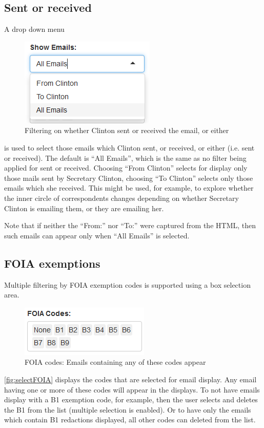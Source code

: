 \documentclass[journal]{vgtc}                %
\begin{document}
\subsection{Sent or received}
A drop down menu 
\begin{figure}[h]
\begin{center}
\includegraphics[width=0.35\linewidth]{ToFromImage}
\caption{Filtering on whether Clinton sent or received the email, or either}
\label{fig:toFromFilter}
\end{center}
\end{figure}
is used to select those emails which Clinton sent, or received, or either (i.e. sent or received).  The default is ``All Emails'', which is the same as no filter being applied for sent or received.  Choosing ``From Clinton'' selects for display only those mails sent by Secretary Clinton, choosing ``To  Clinton'' selects only those emails which she received.  This might be used, for example, to explore whether the inner circle of correspondents changes depending on whether Secretary Clinton is emailing them, or they are emailing her.

Note that if neither the ``From:''  nor ``To:''  were captured from the HTML, then such emails can appear only when ``All Emails'' is selected.


\subsection{FOIA exemptions}
Multiple filtering by FOIA exemption codes is supported using a box selection area. 
\begin{figure}[h]
\begin{center}
\includegraphics[width=0.55\linewidth]{FOIABoxImage}
\caption{FOIA codes:  Emails containing any of these codes appear}
\label{fig:selectFOIA}
\end{center}
\end{figure}
\autoref{fig:selectFOIA} displays the codes that are selected for email display.  Any email having one or more of these codes will appear in the displays.  To not have emails display with a B1 exemption code, for example, then the user selects and deletes the B1 from the list (multiple selection is enabled).  Or to have only the emails which  contain B1 redactions displayed, all other codes can deleted from the list.  
\end{document}
